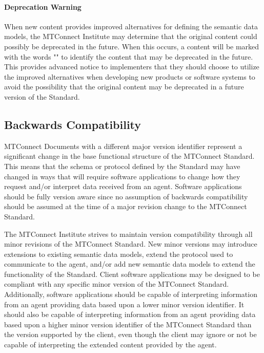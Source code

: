 \documentclass{mtconnect}	%
\begin{document}
\paragraph{Deprecation Warning}\mbox{}

When new content provides improved alternatives for defining the \glspl{semantic data model}, the MTConnect Institute may determine that the original content could possibly be deprecated in the future.  When this occurs, a content will be marked with the words "\DEPRECATIONWARNING" to identify the content that may be deprecated in the future.  This provides advanced notice to implementers that they should choose to utilize the improved alternatives when developing new products or software systems to avoid the possibility that the original content may be deprecated in a future version of the Standard. 


\subsection{Backwards Compatibility}
\label{sec:Backwards Compatibility}

MTConnect Documents with a different \gls{major} version identifier represent a significant change in the \gls{base functional structure} of the MTConnect Standard.  This means that the schema or protocol defined by the Standard may have changed in ways that will require software applications to change how they request and/or interpret data received from an \gls{agent}.  Software applications should be fully version aware since no assumption of backwards compatibility should be assumed at the time of a \gls{major} revision change to the MTConnect Standard.

The MTConnect Institute strives to maintain version compatibility through all \gls{minor} revisions of the MTConnect Standard.  New \gls{minor} versions may introduce extensions to existing \glspl{semantic data model}, extend the protocol used to communicate to the \gls{agent}, and/or add new \glspl{semantic data model} to extend the functionality of the Standard.  Client software applications may be designed to be compliant with any specific \gls{minor} version of the MTConnect Standard.  Additionally, software applications should be capable of interpreting information from an \gls{agent} providing data based upon a lower \gls{minor} version identifier.  It should also be capable of interpreting information from an \gls{agent} providing data based upon a higher \gls{minor} version identifier of the MTConnect Standard than the version supported by the client, even though the client may ignore or not be capable of interpreting the extended content provided by the \gls{agent}.
\end{document}
